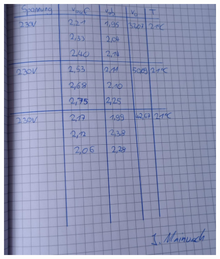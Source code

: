 \begin{figure}[H]
    \centering
    \includegraphics[width=\textwidth]{Bilder/V503.6.jpeg}
\end{figure}